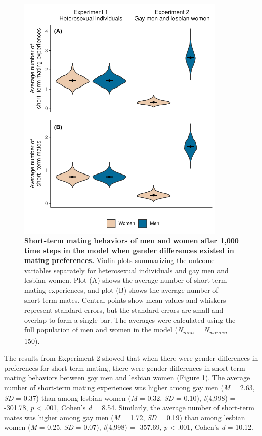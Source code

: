 \documentclass[
  11pt,
]{article}
\begin{document}
\begin{figure}[h]
  \centering
  \includegraphics[width=100mm]{figures/fig1_men_vs_women.pdf}
  \caption{\textbf{Short-term mating behaviors of men and women after 1,000 time steps in the model when gender differences existed in mating preferences.} Violin plots summarizing the outcome variables separately for heterosexual individuals and gay men and lesbian women. Plot (A) shows the average number of short-term mating experiences, and plot (B) shows the average number of short-term mates. Central points show mean values and whiskers represent standard errors, but the standard errors are small and overlap to form a single bar. The averages were calculated using the full population of men and women in the model (\textit{N\textsubscript{men}} = \textit{N\textsubscript{women}} = 150).}
\end{figure}

The results from Experiment 2 showed that when there were gender
differences in preferences for short-term mating, there were gender
differences in short-term mating behaviors between gay men and lesbian
women (Figure 1). The average number of short-term mating experiences
was higher among gay men (\emph{M} = 2.63, \emph{SD} = 0.37) than among
lesbian women (\emph{M} = 0.32, \emph{SD} = 0.10), \emph{t}(4,998) =
-301.78, \emph{p} \textless{} .001, Cohen's \emph{d} = 8.54. Similarly,
the average number of short-term mates was higher among gay men
(\emph{M} = 1.72, \emph{SD} = 0.19) than among lesbian women (\emph{M} =
0.25, \emph{SD} = 0.07), \emph{t}(4,998) = -357.69, \emph{p} \textless{}
.001, Cohen's \emph{d} = 10.12.
\end{document}
